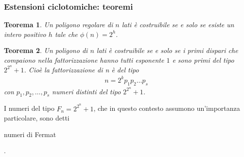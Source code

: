 \documentclass[11pt]{beamer}
\newtheorem{teorema}{Teorema}
\begin{document}
\begin{frame}
\frametitle{Estensioni ciclotomiche: teoremi}

\begin{teorema}
Un poligono regolare di $n$ lati è costruibile se e solo se esiste un intero positivo $h$ tale che $\phi(n) = 2^h$.
\end{teorema}

\begin{teorema}
Un poligono di $n$ lati è costruibile se e solo se i primi dispari che compaiono nella fattorizzazione hanno tutti esponente $1$ e sono primi del tipo $2^{2^{n}} +1$. Cioè la fattorizzazione di n è del tipo
\begin{align*} 
n = 2^k p_1 p_2 \dots p_s
\end{align*}
con $p_1, p_2, \dots, p_s$ numeri distinti del tipo $2^{2^{n}} +1$.
\end{teorema}

\begin{center}
I numeri del tipo $F_n = 2^{2^{n}} +1$, che in questo contesto assumono un'importanza particolare, sono detti \begin{bfseries}numeri di Fermat\end{bfseries}. 
\end{center}
\end{frame}
\end{document}

